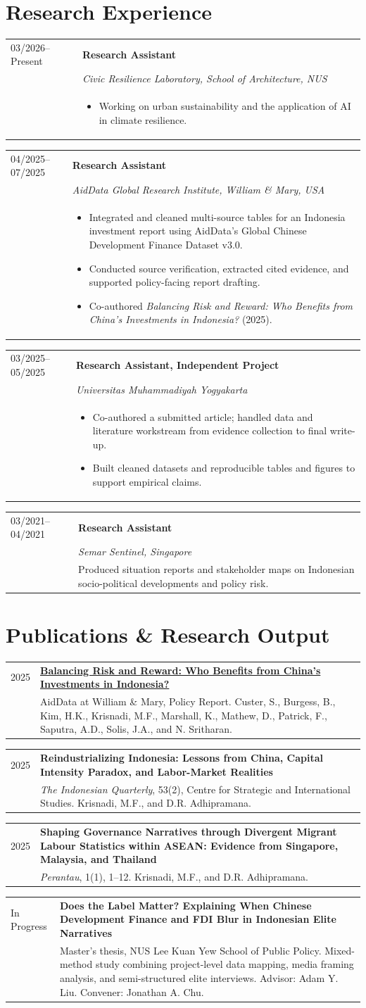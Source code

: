 \documentclass[10pt,a4paper]{article}
\makeatletter
\newcommand{\cvsection}[1]{\section*{#1}}
\newcommand{\entry}[4]{%
  \begin{tabularx}{\textwidth}{@{}p{0.17\textwidth}X@{}}
    \textcolor{muted}{#1} & \textbf{#2}\\
    & \textit{#3}\\
    & #4
  \end{tabularx}\vspace{5pt}
}
\newcommand{\simpleentry}[3]{%
  \begin{tabularx}{\textwidth}{@{}p{0.17\textwidth}X@{}}
    \textcolor{muted}{#1} & \textbf{#2}\\
    & #3
  \end{tabularx}\vspace{4pt}
}
\makeatother
\begin{document}
\cvsection{Research Experience}
\entry{03/2026--Present}{Research Assistant}{Civic Resilience Laboratory, School of Architecture, NUS}{\begin{itemize}
  \item Working on urban sustainability and the application of AI in climate resilience.
\end{itemize}}
\entry{04/2025--07/2025}{Research Assistant}{AidData Global Research Institute, William \& Mary, USA}{\begin{itemize}
  \item Integrated and cleaned multi-source tables for an Indonesia investment report using AidData's Global Chinese Development Finance Dataset v3.0.
  \item Conducted source verification, extracted cited evidence, and supported policy-facing report drafting.
  \item Co-authored \textit{Balancing Risk and Reward: Who Benefits from China's Investments in Indonesia?} (2025).
\end{itemize}}
\entry{03/2025--05/2025}{Research Assistant, Independent Project}{Universitas Muhammadiyah Yogyakarta}{\begin{itemize}
  \item Co-authored a submitted article; handled data and literature workstream from evidence collection to final write-up.
  \item Built cleaned datasets and reproducible tables and figures to support empirical claims.
\end{itemize}}
\entry{03/2021--04/2021}{Research Assistant}{Semar Sentinel, Singapore}{Produced situation reports and stakeholder maps on Indonesian socio-political developments and policy risk.}

\cvsection{Publications \& Research Output}
\simpleentry{2025}{\href{https://www.aiddata.org/publications/balancing-risk-and-reward}{Balancing Risk and Reward: Who Benefits from China's Investments in Indonesia?}}{AidData at William \& Mary, Policy Report. Custer, S., Burgess, B., Kim, H.K., Krisnadi, M.F., Marshall, K., Mathew, D., Patrick, F., Saputra, A.D., Solis, J.A., and N. Sritharan.}
\simpleentry{2025}{Reindustrializing Indonesia: Lessons from China, Capital Intensity Paradox, and Labor-Market Realities}{\textit{The Indonesian Quarterly}, 53(2), Centre for Strategic and International Studies. Krisnadi, M.F., and D.R. Adhipramana.}
\simpleentry{2025}{Shaping Governance Narratives through Divergent Migrant Labour Statistics within ASEAN: Evidence from Singapore, Malaysia, and Thailand}{\textit{Perantau}, 1(1), 1--12. Krisnadi, M.F., and D.R. Adhipramana.}
\simpleentry{In Progress}{Does the Label Matter? Explaining When Chinese Development Finance and FDI Blur in Indonesian Elite Narratives}{Master's thesis, NUS Lee Kuan Yew School of Public Policy. Mixed-method study combining project-level data mapping, media framing analysis, and semi-structured elite interviews. Advisor: Adam Y. Liu. Convener: Jonathan A. Chu.}
\end{document}
